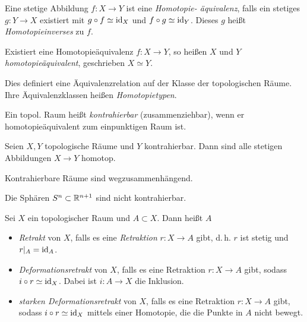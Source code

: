 \documentclass{cheat-sheet}
\begin{document}
\begin{defn}
  Eine stetige Abbildung $f : X \to Y$ ist eine \emph{Homotopie- äquivalenz}, falls ein stetiges $g : Y \to X$ existiert mit $g \circ f \simeq \mathrm{id}_X$ und $f \circ g \simeq \mathrm{id}_Y$. Dieses $g$ heißt \emph{Homotopieinverses} zu $f$.
\end{defn}

\begin{defn}
  Existiert eine Homotopieäquivalenz $f : X \to Y$, so heißen $X$ und $Y$ \emph{homotopieäquivalent}, geschrieben $X \simeq Y$.
\end{defn}

\begin{bem}
  Dies definiert eine Äquivalenzrelation auf der Klasse der topologischen Räume. Ihre Äquivalenzklassen heißen \emph{Homotopietypen}.
\end{bem}

\begin{defn}
  Ein topol. Raum heißt \emph{kontrahierbar} (zusammenziehbar), wenn er homotopieäquivalent zum einpunktigen Raum ist.
\end{defn}

\begin{lem}
  Seien $X, Y$ topologische Räume und $Y$ kontrahierbar. Dann sind alle stetigen Abbildungen $X \to Y$ homotop.
\end{lem}

\begin{kor}
  Kontrahierbare Räume sind wegzusammenhängend.
\end{kor}

\begin{prop}
  Die Sphären $S^n \subset \mathbb{R}^{n+1}$ sind nicht kontrahierbar.
\end{prop}

\begin{defn}
  Sei $X$ ein topologischer Raum und $A \subset X$. Dann heißt $A$
  \begin{itemize}
    \item \emph{Retrakt} von $X$, falls es eine \emph{Retraktion} $r : X \to A$ gibt, d.\,h. $r$ ist stetig und $r|_A = \mathrm{id}_A$.
    \item \emph{Deformationsretrakt} von $X$, falls es eine Retraktion $r : X \to A$ gibt, sodass $i \circ r \simeq \mathrm{id}_X$. Dabei ist $i : A \to X$ die Inklusion.
    \item \emph{starken Deformationsretrakt} von $X$, falls es eine Retraktion $r : X \to A$ gibt, sodass $i \circ r \simeq \mathrm{id}_X$ mittels einer Homotopie, die die Punkte in $A$ nicht bewegt.
  \end{itemize}
\end{defn}
\end{document}
